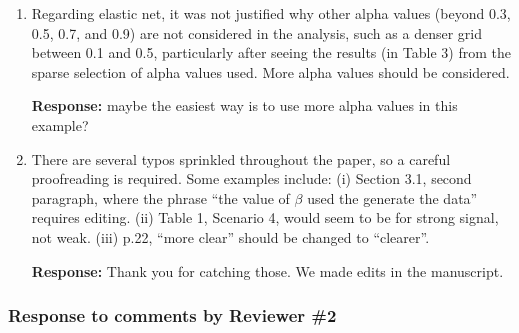 \documentclass[12]{article}
\newcommand{\re}{\textbf{Response: }}
\newcommand\bd[1]{{\color{blue}#1}}
\begin{document}
\begin{enumerate}[align = left]
\re Thank you for the suggeston. We included the precision lasso method in the discussion section.

\item Regarding elastic net, it was not justified why other alpha values (beyond 0.3, 0.5, 0.7, and 0.9) are not considered in the analysis, such as a denser grid between 0.1 and 0.5, particularly after seeing the results (in Table 3) from the sparse selection of alpha values used. More alpha values should be considered.

\re \bd{maybe the easiest way is to use more alpha values in this example?}

\item There are several typos sprinkled throughout the paper, so a careful proofreading is required. Some examples include: (i) Section 3.1, second paragraph, where the phrase “the value of $\beta$ used the generate the data” requires editing. (ii) Table 1, Scenario 4, would seem to be for
strong signal, not weak. (iii) p.22, “more clear” should be changed to “clearer”.

\re Thank you for catching those. We made edits in the manuscript.

\end{enumerate}

\newpage

\subsubsection*{Response to comments by Reviewer \#2}
\end{document}
